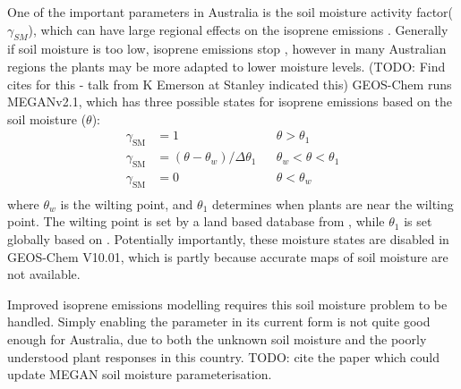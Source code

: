   One of the important parameters in Australia is the soil moisture activity factor($\gamma_{SM}$), which can have large regional effects on the isoprene emissions \parencite{Sindelarova2014,Bauwens2016}.
  Generally if soil moisture is too low, isoprene emissions stop \parencite{Pegoraro2004,Niinemets2010}, however in many Australian regions the plants may be more adapted to lower moisture levels. (TODO: Find cites for this - talk from K Emerson at Stanley indicated this)
  GEOS-Chem runs MEGANv2.1, which has three possible states for isoprene emissions based on the soil moisture ($\theta$):
  \begin{align*}
  \gamma_\mathrm{SM} & = 1 && \theta > \theta_1 \\
  \gamma_\mathrm{SM} & = (\theta-\theta_w)/\Delta\theta_1  && \theta_w < \theta < \theta_1 \\
  \gamma_\mathrm{SM} & = 0 && \theta < \theta_w \\
  \end{align*}
  where $\theta_w$ is the wilting point, and $\theta_1$ determines when plants are near the wilting point.
  The wilting point is set by a land based database from \textcite{Chen2001}, while $\theta_1$ is set globally based on \textcite{Pegoraro2004}.
  Potentially importantly, these moisture states are disabled in GEOS-Chem V10.01, which is partly because accurate maps of soil moisture are not available.
  
  Improved isoprene emissions modelling requires this soil moisture problem to be handled.
  Simply enabling the parameter in its current form is not quite good enough for Australia, due to both the unknown soil moisture and the poorly understood plant responses in this country.
  TODO: cite the paper which could update MEGAN soil moisture parameterisation.